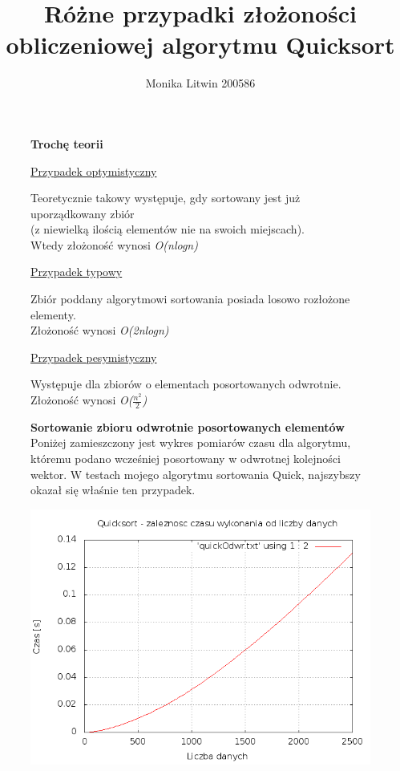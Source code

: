 \documentclass[a4paper,11pt]{report}
\title{Różne przypadki złożoności obliczeniowej algorytmu Quicksort}
\author{Monika Litwin 200586}
\begin{document}
\maketitle

\begin{figure}
  \begin{center}
  \textbf{Trochę teorii}
\\
\begin{flushleft}\underline{Przypadek optymistyczny}\end{flushleft}
Teoretycznie takowy występuje, gdy sortowany jest już uporządkowany zbiór \\(z niewielką ilością elementów nie na swoich miejscach). \\Wtedy złożoność wynosi \emph{O(nlogn)}

\begin{flushleft}\underline{Przypadek typowy}\end{flushleft}
Zbiór poddany algorytmowi sortowania posiada losowo rozłożone elementy.\\ Złożoność wynosi \emph{O(2nlogn)}

\begin{flushleft}\underline{Przypadek pesymistyczny}\end{flushleft}
Występuje dla zbiorów o elementach posortowanych odwrotnie.\\ Złożoność wynosi \emph{O($\frac {n^{2}}{2}$)}

    \label{fig:}
  \end{center}
\end{figure}

\begin{figure}
  \begin{center}
	\textbf{Sortowanie zbioru odwrotnie posortowanych elementów}
\\ Poniżej zamieszczony jest wykres pomiarów czasu dla algorytmu, któremu podano wcześniej posortowany w odwrotnej kolejności wektor. 
W testach mojego algorytmu sortowania Quick, najszybszy okazał się właśnie ten przypadek.

    \includegraphics[scale=0.5]{./odwrotnie_posortowane.png}
    \label{fig:}
  \end{center}
\end{figure}
\end{document}
